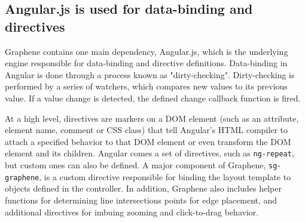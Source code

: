 \subsection{Angular.js is used for data-binding and directives}
Graphene contains one main dependency, Angular.js, which is the underlying engine responsible for data-binding and directive definitions.
Data-binding in Angular is done through a process known as "dirty-checking".
Dirty-checking is performed by a series of watchers, which compares new values to its previous value. \autocite{google2014angularScope}
If a value change is detected, the defined change callback function is fired.

At a high level, directives are markers on a DOM element (such as an attribute, element name, comment or CSS class) that tell Angular's HTML compiler to attach a specified behavior to that DOM element or even transform the DOM element and its children. \autocite{google2014angularDirectives, google2014angulardirectives2}
Angular comes a set of directives, such as \texttt{ng-repeat}, but custom ones can also be defined.
A major component of Graphene, \texttt{sg-graphene}, is a custom directive responsible for binding the layout template to objects defined in the controller.
In addition, Graphene also includes helper functions for determining line intersections points for edge placement, and additional directives for imbuing zooming and click-to-drag behavior.


